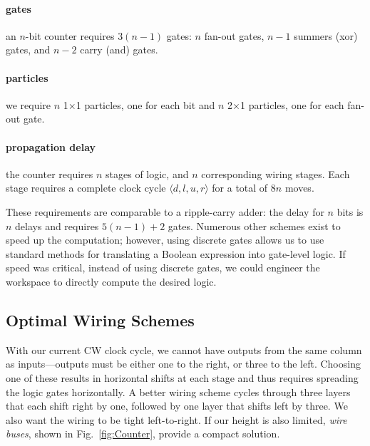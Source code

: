 \documentclass[letterpaper, 10 pt, conference]{ieeeconf}
\begin{document}
\paragraph{gates}  an $n$-bit counter requires $3(n-1)$ gates: $n$ {\sc fan-out} gates, $n-1$ summers ({\sc xor}) gates, and $n-2$ carry ({\sc and}) gates. 
\paragraph{particles} we require $n$ 1$\times$1 particles, one for each bit and $n$ 2$\times$1 particles, one for each {\sc fan-out} gate.
\paragraph{ propagation delay} the counter requires $n$ stages of logic, and $n$ corresponding wiring stages.  Each stage requires a complete clock cycle $\langle d,l,u,r \rangle$ for a total of 8$n$ moves.

These requirements are comparable to a ripple-carry adder:  the delay for $n$ bits is $n$ delays  and requires $5(n-1)+2$ gates.
Numerous other schemes exist to speed up the computation; however, using discrete gates allows us to use standard methods for translating a Boolean expression into gate-level logic.  If speed was critical, instead of using discrete gates, we could engineer the workspace to directly compute the desired logic.  

\subsection{Optimal Wiring Schemes}\label{sec:wiring}
With our current CW clock cycle, we cannot have outputs from the same column as
inputs---outputs must be either one to the right, or three to the left.  
Choosing one of these results in horizontal shifts at each stage and thus
requires spreading the logic gates horizontally. A better wiring scheme cycles
through three layers that each shift right by one, followed by one layer that
shifts left by three.  We also want the wiring to be tight left-to-right.  If our
height is also limited, \emph{wire buses}, shown in Fig.~\ref{fig:Counter}, provide a compact solution. 

\end{document}
